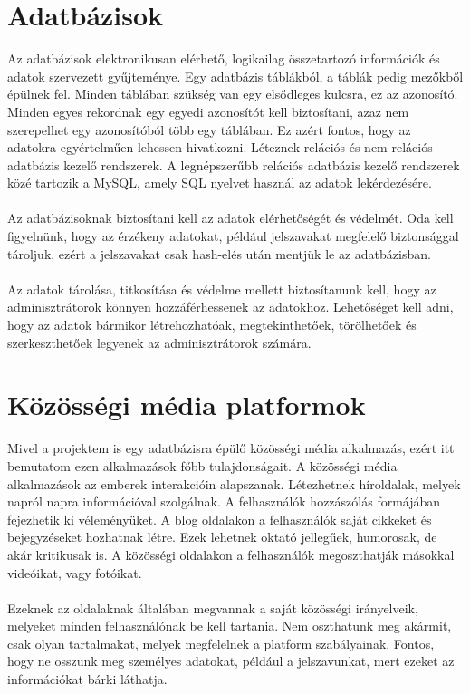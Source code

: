 \documentclass[
]{thesis-ekf}
\theoremstyle{definition}
\theoremstyle{remark}
\begin{document}
\section{Adatbázisok}

Az adatbázisok elektronikusan elérhető, logikailag összetartozó információk és adatok szervezett gyűjteménye. Egy adatbázis táblákból, a táblák pedig mezőkből épülnek fel. Minden táblában szükség van egy elsődleges kulcsra, ez az azonosító. Minden egyes rekordnak egy egyedi azonosítót kell biztosítani, azaz nem szerepelhet egy azonosítóból több egy táblában. Ez azért fontos, hogy az adatokra egyértelműen lehessen hivatkozni. Léteznek relációs és nem relációs adatbázis kezelő rendszerek. A legnépszerűbb relációs adatbázis kezelő rendszerek közé tartozik a MySQL, amely SQL nyelvet használ az adatok lekérdezésére.
\\\\
Az adatbázisoknak biztosítani kell az adatok elérhetőségét és védelmét. Oda kell figyelnünk, hogy az érzékeny adatokat, például jelszavakat megfelelő biztonsággal tároljuk, ezért a jelszavakat csak hash-elés után mentjük le az adatbázisban. 
\\\\
Az adatok tárolása, titkosítása és védelme mellett biztosítanunk kell, hogy az adminisztrátorok könnyen hozzáférhessenek az adatokhoz. Lehetőséget kell adni, hogy az adatok bármikor létrehozhatóak, megtekinthetőek, törölhetőek és szerkeszthetőek legyenek az adminisztrátorok számára.

\section{Közösségi média platformok}

Mivel a projektem is egy adatbázisra épülő közösségi média alkalmazás, ezért itt bemutatom ezen alkalmazások főbb tulajdonságait. A közösségi média alkalmazások az emberek interakcióin alapszanak. Létezhetnek híroldalak, melyek napról napra információval szolgálnak. A felhasználók hozzászólás formájában fejezhetik ki véleményüket. A blog oldalakon a felhasználók saját cikkeket és bejegyzéseket hozhatnak létre. Ezek lehetnek oktató jellegűek, humorosak, de akár kritikusak is. A közösségi oldalakon a felhasználók megoszthatják másokkal videóikat, vagy fotóikat.
\\\\
Ezeknek az oldalaknak általában megvannak a saját közösségi irányelveik, melyeket minden felhasználónak be kell tartania. Nem oszthatunk meg akármit, csak olyan tartalmakat, melyek megfelelnek a platform szabályainak. Fontos, hogy ne osszunk meg személyes adatokat, például a jelszavunkat, mert ezeket az információkat bárki láthatja.
\end{document}
